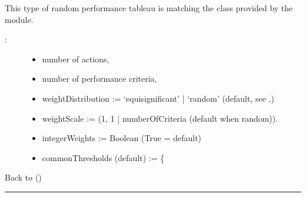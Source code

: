 \documentclass[a4paper,12pt,english]{sphinxhowto}
\begin{document}
This type of random performance tableau is matching the  class provided by the  module.
\begin{description}
\item[{:}] \leavevmode\begin{itemize}
\item {} 
number of actions,

\item {} 
number of performance criteria,

\item {} 
weightDistribution := ‘equisignificant’ | ‘random’ (default, see ,)

\item {} 
weightScale := (1, 1 | numberOfCriteria (default when random)).

\item {} 
integerWeights := Boolean (True = default)

\item {} 
commonThresholds (default) := \{
\begin{quote}

\end{quote}

\end{itemize}

\end{description}

Back to {\hyperref[\detokenize{tutorial:tutorial-label}]{}} ()


\bigskip\hrule\bigskip
\end{document}
